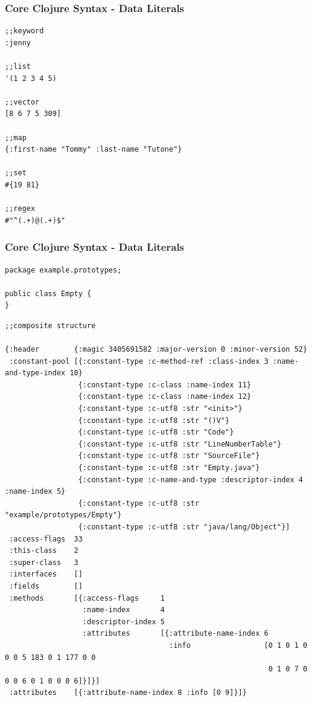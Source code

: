 \documentclass{beamer}
\begin{document}
\begin{frame}[fragile]
  \frametitle{Core Clojure Syntax - Data Literals}
  \begin{verbatim}
;;keyword
:jenny

;;list
'(1 2 3 4 5)

;;vector
[8 6 7 5 309]                                  

;;map
{:first-name "Tommy" :last-name "Tutone"}      

;;set
#{19 81}                                       

;;regex
#"^(.+)@(.+)$"
\end{verbatim}  
\end{frame}

\begin{frame}[fragile]
  \frametitle{Core Clojure Syntax - Data Literals}
  \begin{verbatim}
package example.prototypes;

public class Empty {
}
  \end{verbatim}
  \begin{verbatim}
;;composite structure

{:header        {:magic 3405691582 :major-version 0 :minor-version 52}
 :constant-pool [{:constant-type :c-method-ref :class-index 3 :name-and-type-index 10}
                 {:constant-type :c-class :name-index 11}
                 {:constant-type :c-class :name-index 12}
                 {:constant-type :c-utf8 :str "<init>"}
                 {:constant-type :c-utf8 :str "()V"}
                 {:constant-type :c-utf8 :str "Code"}
                 {:constant-type :c-utf8 :str "LineNumberTable"}
                 {:constant-type :c-utf8 :str "SourceFile"}
                 {:constant-type :c-utf8 :str "Empty.java"}
                 {:constant-type :c-name-and-type :descriptor-index 4 :name-index 5}
                 {:constant-type :c-utf8 :str "example/prototypes/Empty"}
                 {:constant-type :c-utf8 :str "java/lang/Object"}]
 :access-flags  33
 :this-class    2
 :super-class   3
 :interfaces    []
 :fields        []
 :methods       [{:access-flags     1
                  :name-index       4
                  :descriptor-index 5
                  :attributes       [{:attribute-name-index 6
                                      :info                 [0 1 0 1 0 0 0 5 183 0 1 177 0 0
                                                             0 1 0 7 0 0 0 6 0 1 0 0 0 6]}]}]
 :attributes    [{:attribute-name-index 8 :info [0 9]}]}

\end{verbatim}  
\end{frame}
\end{document}
